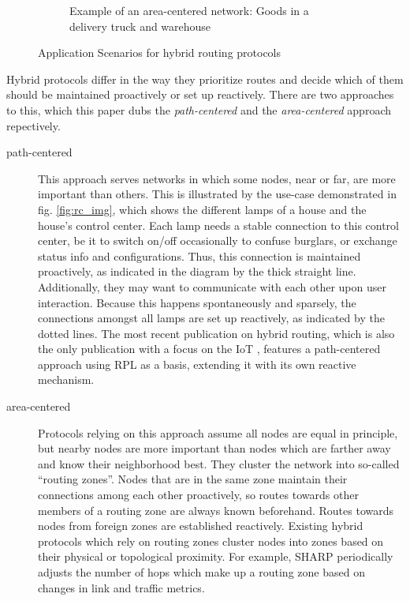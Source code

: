 \documentclass[a4paper,10pt]{scrartcl}
\begin{document}
\begin{figure}
\begin{subfigure}[b]{0.5\textwidth}
                \caption{Example of an area-centered network: Goods in a delivery truck and warehouse}
                \label{fig:ac_img}
        \end{subfigure}
        \caption{Application Scenarios for hybrid routing protocols}\label{fig:scope}
\end{figure}

Hybrid protocols differ in the way they prioritize routes and decide which of them should be maintained proactively or set up reactively. There are two approaches to this, which this paper dubs the \emph{path-centered} and the \emph{area-centered} approach repectively.\\

\begin{description}
\item[path-centered] This approach serves networks in which some nodes, near or far, are more important than others. This is illustrated by the use-case demonstrated in fig. \ref{fig:rc_img}, which shows the different lamps of a house and the house's control center. Each lamp needs a stable connection to this control center, be it to switch on/off occasionally to confuse burglars, or exchange status info and configurations. Thus, this connection is maintained proactively, as indicated in the diagram by the thick straight line. Additionally, they may want to communicate with each other upon user interaction. Because this happens spontaneously and sparsely, the connections amongst all lamps are set up reactively, as indicated by the dotted lines.
The most recent publication on hybrid routing, which is also the only publication with a focus on the IoT \cite{RFC-6997}, features a path-centered approach using \gls{RPL}\cite{RFC-6550} as a basis, extending it with its own reactive mechanism.
\\
\item[area-centered] Protocols relying on this approach assume all nodes are equal in principle, but nearby nodes are more important than nodes which are farther away and know their neighborhood best. They cluster the network into so-called ``routing zones''. Nodes that are in the same zone maintain their connections among each other proactively, so routes towards other members of a routing zone are always known beforehand.
Routes towards nodes from foreign zones are established reactively. %
Existing hybrid protocols which rely on routing zones cluster nodes into zones based on their physical or topological proximity. For example, SHARP periodically adjusts the number of hops which make up a routing zone based on changes in link and traffic metrics.\\

\end{description}
\end{document}
